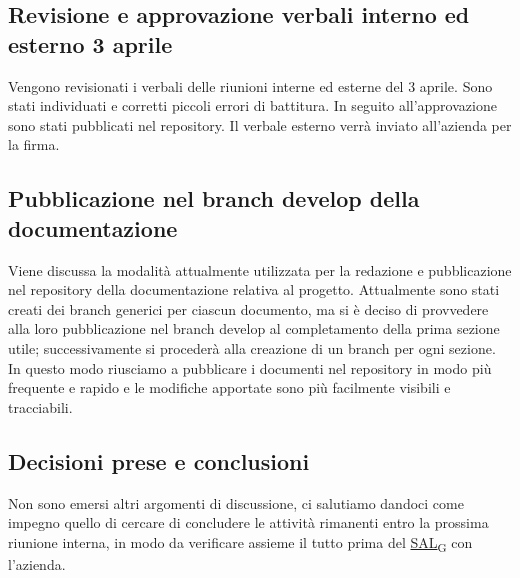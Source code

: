 \documentclass[italian,12pt]{article}
\begin{document}
\subsection{Revisione e approvazione verbali interno ed esterno 3 aprile}
Vengono revisionati i verbali delle riunioni interne ed esterne del 3 aprile. Sono stati individuati e corretti piccoli errori di battitura. In seguito all'approvazione sono stati pubblicati nel repository. Il verbale esterno verrà inviato all'azienda per la firma.

\subsection{Pubblicazione nel branch develop della documentazione}
Viene discussa la modalità attualmente utilizzata per la redazione e pubblicazione nel repository della documentazione relativa al progetto. Attualmente sono stati creati dei branch generici per ciascun documento, ma si è deciso di provvedere alla loro pubblicazione nel branch develop al completamento della prima sezione utile; successivamente si procederà alla creazione di un branch per ogni sezione. In questo modo riusciamo a pubblicare i documenti nel repository in modo più frequente e rapido e le modifiche apportate sono più facilmente visibili e tracciabili.

\subsection{Decisioni prese e conclusioni}
Non sono emersi altri argomenti di discussione, ci salutiamo dandoci come impegno quello di cercare di concludere le attività rimanenti entro la prossima riunione interna, in modo da verificare assieme il tutto prima del \href{https://7last.github.io/docs/rtb/documentazione-interna/glossario#sal}{SAL\textsubscript{G}} con l'azienda.
\end{document}
